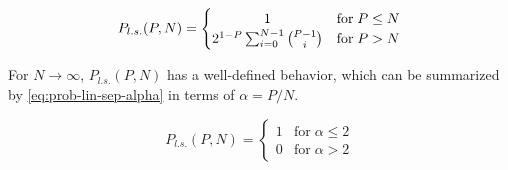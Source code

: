 \begin{equation} \label{eq:prob-lin-sep}
    P_{l.s.}(P,N) = \begin{cases}
        \hfil 1 & \text{for} \; P \leq N\\
        2^{1-P} \sum^{N-1}_{i=0} \binom{P - 1}{i} & \text{for} \; P > N       
    \end{cases}
\end{equation}

For $N \rightarrow \infty$, $P_{l.s.}(P,N)$ has a well-defined behavior, which can be summarized by \cref{eq:prob-lin-sep-alpha} in terms of $\alpha = P / N$.

\begin{equation} \label{eq:prob-lin-sep-alpha}
    P_{l.s.}(P,N) = \begin{cases}
        1 & \text{for} \; \alpha \leq 2\\
        0 & \text{for} \; \alpha > 2
    \end{cases}
\end{equation} 
